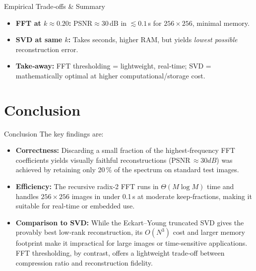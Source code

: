 \documentclass[12pt]{beamer}
\begin{document}
\begin{frame}{Empirical Trade‑offs \& Summary}
  \begin{itemize}
    \item \textbf{FFT at $k\approx0.20$:}  
      PSNR$\approx30\,$dB in $\lesssim0.1\,$s for $256\times256$, minimal memory.
    \item \textbf{SVD at same $k$:}  
      Takes seconds, higher RAM, but yields \emph{lowest possible} reconstruction error.
    \item \textbf{Take‑away:}  
      FFT thresholding = lightweight, real‑time;  
      SVD = mathematically optimal at higher computational/storage cost.
  \end{itemize}
\end{frame}








\section{Conclusion}

\begin{frame}{Conclusion}
  The key findings are:
  \begin{itemize}
    \item \textbf{Correctness:}  
      Discarding a small fraction of the highest‑frequency FFT coefficients yields visually faithful reconstructions (PSNR $\approx 30 dB$) was achieved by retaining only 20 \% of the spectrum on standard test images.
    \item \textbf{Efficiency:}  
      The recursive radix‑2 FFT runs in $\Theta(M\log M)$ time and handles $256\times256$ images in under 0.1 s at moderate keep‑fractions, making it suitable for real‑time or embedded use.
    \item \textbf{Comparison to SVD:}  
      While the Eckart–Young truncated SVD gives the provably best low‑rank reconstruction, its $O(N^3)$ cost and larger memory footprint make it impractical for large images or time‑sensitive applications. FFT thresholding, by contrast, offers a lightweight trade‑off between compression ratio and reconstruction fidelity.
  \end{itemize}
  \end{frame}


\appendix
\end{document}
